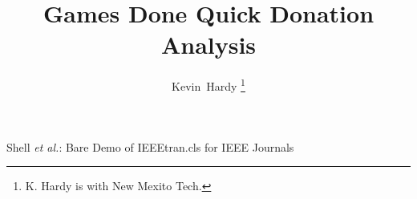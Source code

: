 \documentclass[journal]{IEEEtran}
\begin{document}
%
\title{Games Done Quick Donation Analysis}
%
%
%

\author{Kevin~Hardy%
\thanks{K. Hardy is with New Mexito Tech.}%
}

% 
%



%
{Shell \MakeLowercase{\textit{et al.}}: Bare Demo of IEEEtran.cls for IEEE Journals}
% 
\end{document}
